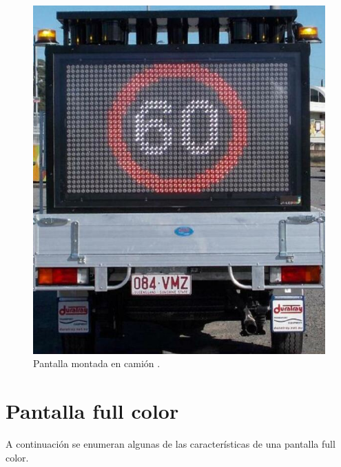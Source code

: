 \begin{figure}[htpb]
	\centering
	\includegraphics[scale=1]{../Figures/vmstruck.png} 
	\caption{Pantalla montada en camión \protect\footnotemark.}
	\label{fig:vmsc}
\end{figure}


\section{Pantalla full color}
A continuación se enumeran algunas de las características de una pantalla full color.






